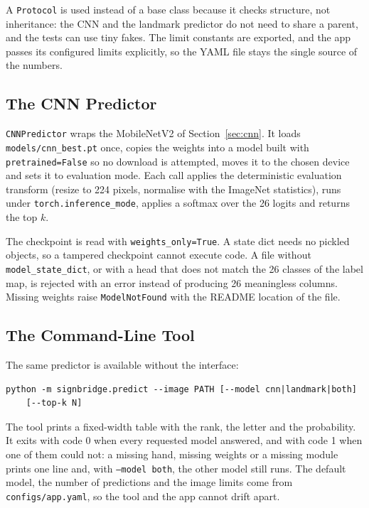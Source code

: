 A \texttt{Protocol} is used instead of a base class because it checks structure, not inheritance: the CNN and the landmark predictor do not need to share a parent, and the tests can use tiny fakes. The limit constants are exported, and the app passes its configured limits explicitly, so the YAML file stays the single source of the numbers.

\subsection{The CNN Predictor}

\texttt{CNNPredictor} wraps the MobileNetV2 of Section~\ref{sec:cnn}. It loads \texttt{models/cnn\_best.pt} once, copies the weights into a model built with \texttt{pretrained=False} so no download is attempted, moves it to the chosen device and sets it to evaluation mode. Each call applies the deterministic evaluation transform (resize to 224 pixels, normalise with the ImageNet statistics), runs under \texttt{torch.inference\_mode}, applies a softmax over the 26 logits and returns the top $k$.

The checkpoint is read with \texttt{weights\_only=True}. A state dict needs no pickled objects, so a tampered checkpoint cannot execute code. A file without \texttt{model\_state\_dict}, or with a head that does not match the 26 classes of the label map, is rejected with an error instead of producing 26 meaningless columns. Missing weights raise \texttt{ModelNotFound} with the README location of the file.

\subsection{The Command-Line Tool}

The same predictor is available without the interface:

\begin{verbatim}
python -m signbridge.predict --image PATH [--model cnn|landmark|both]
    [--top-k N]
\end{verbatim}

The tool prints a fixed-width table with the rank, the letter and the probability. It exits with code 0 when every requested model answered, and with code 1 when one of them could not: a missing hand, missing weights or a missing module prints one line and, with \texttt{--model both}, the other model still runs. The default model, the number of predictions and the image limits come from \texttt{configs/app.yaml}, so the tool and the app cannot drift apart.

